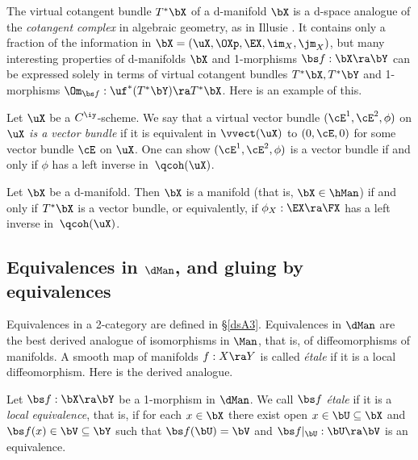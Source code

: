 \documentclass{article}
\begin{document}
The virtual cotangent bundle $T^*\bX$ of
a d-manifold $\bX$ is a d-space analogue of the {\it cotangent
complex\/} in algebraic geometry, as in Illusie
\cite{Illu}. It contains only a fraction of the information in
$\bX=(\uX,\OXp,\EX,\im_X, \jm_X)$, but many interesting properties
of d-manifolds $\bX$ and 1-morphisms $\bs f:\bX\ra\bY$ can be
expressed solely in terms of virtual cotangent bundles
$T^*\bX,T^*\bY$ and 1-morphisms $\Om_{\bs f}:\uf^*(T^*\bY)\ra
T^*\bX$. Here is an example of this.

\begin{dfn} Let $\uX$ be a $C^\iy$-scheme. We say that a
virtual vector bundle $(\cE^1,\cE^2,\phi)$ on $\uX$ {\it is a vector
bundle\/} if it is equivalent in $\vvect(\uX)$ to $(0,\cE,0)$ for
some vector bundle $\cE$ on $\uX$. One can show $(\cE^1,\cE^2,\phi)$
is a vector bundle if and only if $\phi$ has a left inverse
in~$\qcoh(\uX)$.
\label{ds4def4}
\end{dfn}

\begin{prop} Let\/ $\bX$ be a d-manifold. Then $\bX$ is a manifold
(that is, $\bX\in\hMan$) if and only if\/ $T^*\bX$ is a vector
bundle, or equivalently, if\/ $\phi_X:\EX\ra\FX$ has a left inverse
in\/~$\qcoh(\uX)$.
\label{ds4prop3}
\end{prop}

\subsection{Equivalences in $\dMan$, and gluing by equivalences}
\label{ds44}

Equivalences in a 2-category are defined in \S\ref{dsA3}.
Equivalences in $\dMan$ are the best derived analogue of
isomorphisms in $\Man$, that is, of diffeomorphisms of manifolds. A
smooth map of manifolds $f:X\ra Y$ is called {\it \'etale\/} if it
is a local diffeomorphism. Here is the derived analogue.

\begin{dfn} Let $\bs f:\bX\ra\bY$ be a 1-morphism in $\dMan$. We
call $\bs f$ {\it \'etale\/} if it is a {\it local equivalence},
that is, if for each $x\in\bX$ there exist open
$x\in\bU\subseteq\bX$ and $\bs f(x)\in\bV\subseteq\bY$ such that
$\bs f(\bU)=\bV$ and $\bs f\vert_\bU:\bU\ra\bV$ is an equivalence.
\label{ds4def5}
\end{dfn}
\end{document}
